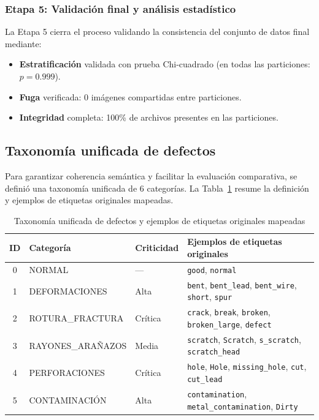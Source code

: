 \subsubsection{Etapa 5: Validación final y análisis estadístico}

La Etapa 5 cierra el proceso validando la consistencia del conjunto de datos final mediante:
\begin{itemize}
    \item \textbf{Estratificación} validada con prueba Chi-cuadrado (en todas las particiones: $p=0.999$).
    \item \textbf{Fuga} verificada: 0 imágenes compartidas entre particiones.
    \item \textbf{Integridad} completa: 100\% de archivos presentes en las particiones.
\end{itemize}

\subsection{Taxonomía unificada de defectos}

Para garantizar coherencia semántica y facilitar la evaluación comparativa, se definió una taxonomía unificada de 6 categorías. La Tabla~\ref{tab:fase0_taxonomia} resume la definición y ejemplos de etiquetas originales mapeadas.

\begin{table}[htbp]
\centering
\begin{tabular}{cllp{6.6cm}}
\toprule
\textbf{ID} & \textbf{Categoría} & \textbf{Criticidad} & \textbf{Ejemplos de etiquetas originales} \\
\midrule
0 & NORMAL & --- & \texttt{good}, \texttt{normal} \\
1 & DEFORMACIONES & Alta & \texttt{bent}, \texttt{bent\_lead}, \texttt{bent\_wire}, \texttt{short}, \texttt{spur} \\
2 & \mbox{ROTURA\_FRACTURA} & Crítica & \texttt{crack}, \texttt{break}, \texttt{broken}, \texttt{broken\_large}, \texttt{defect} \\
3 & \mbox{RAYONES\_ARAÑAZOS} & Media & \texttt{scratch}, \texttt{Scratch}, \texttt{s\_scratch}, \texttt{scratch\_head} \\
4 & PERFORACIONES & Crítica & \texttt{hole}, \texttt{Hole}, \texttt{missing\_hole}, \texttt{cut}, \texttt{cut\_lead} \\
5 & CONTAMINACIÓN & Alta & \texttt{contamination}, \texttt{metal\_contamination}, \texttt{Dirty} \\
\bottomrule
\end{tabular}
\caption{Taxonomía unificada de defectos y ejemplos de etiquetas originales mapeadas}
\label{tab:fase0_taxonomia}
\end{table}

